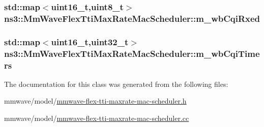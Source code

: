 \subsubsection[{\texorpdfstring{m\+\_\+wb\+Cqi\+Rxed}{m_wbCqiRxed}}]{\setlength{\rightskip}{0pt plus 5cm}std\+::map$<$uint16\+\_\+t,uint8\+\_\+t$>$ ns3\+::\+Mm\+Wave\+Flex\+Tti\+Max\+Rate\+Mac\+Scheduler\+::m\+\_\+wb\+Cqi\+Rxed\hspace{0.3cm}{\ttfamily [private]}}\hypertarget{classns3_1_1MmWaveFlexTtiMaxRateMacScheduler_adf66188149ac6a56b4a58f742a27187b}{}\label{classns3_1_1MmWaveFlexTtiMaxRateMacScheduler_adf66188149ac6a56b4a58f742a27187b}
\subsubsection[{\texorpdfstring{m\+\_\+wb\+Cqi\+Timers}{m_wbCqiTimers}}]{\setlength{\rightskip}{0pt plus 5cm}std\+::map$<$uint16\+\_\+t,uint32\+\_\+t$>$ ns3\+::\+Mm\+Wave\+Flex\+Tti\+Max\+Rate\+Mac\+Scheduler\+::m\+\_\+wb\+Cqi\+Timers\hspace{0.3cm}{\ttfamily [private]}}\hypertarget{classns3_1_1MmWaveFlexTtiMaxRateMacScheduler_acabe6aa89f19153f8ce386a5fad72aed}{}\label{classns3_1_1MmWaveFlexTtiMaxRateMacScheduler_acabe6aa89f19153f8ce386a5fad72aed}


The documentation for this class was generated from the following files\+:\begin{DoxyCompactItemize}
\item 
mmwave/model/\hyperlink{mmwave-flex-tti-maxrate-mac-scheduler_8h}{mmwave-\/flex-\/tti-\/maxrate-\/mac-\/scheduler.\+h}\item 
mmwave/model/\hyperlink{mmwave-flex-tti-maxrate-mac-scheduler_8cc}{mmwave-\/flex-\/tti-\/maxrate-\/mac-\/scheduler.\+cc}\end{DoxyCompactItemize}
